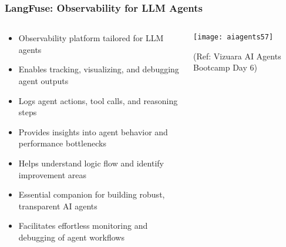 \begin{frame}[fragile]\frametitle{LangFuse: Observability for LLM Agents}

	  
\begin{columns}
    \begin{column}[T]{0.6\linewidth}
      \begin{itemize}
	\item Observability platform tailored for LLM agents
	\item Enables tracking, visualizing, and debugging agent outputs
	\item Logs agent actions, tool calls, and reasoning steps
	\item Provides insights into agent behavior and performance bottlenecks
	\item Helps understand logic flow and identify improvement areas
	\item Essential companion for building robust, transparent AI agents
	\item Facilitates effortless monitoring and debugging of agent workflows
	  \end{itemize}
    \end{column}
    \begin{column}[T]{0.4\linewidth}
		\begin{center}
		\texttt{[image: aiagents57]}
		
		{\tiny (Ref: Vizuara AI Agents Bootcamp Day 6)}

		\end{center}	
    \end{column}
  \end{columns}	  
\end{frame}

